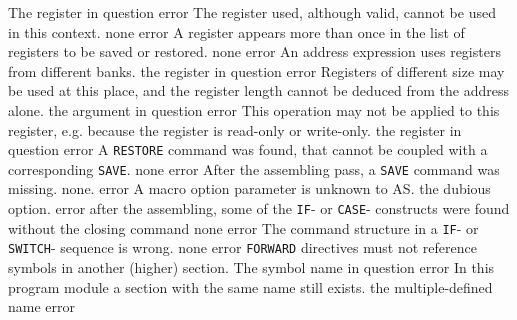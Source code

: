 \documentclass[12pt,twoside]{report}
\newcommand{\tty}[1]{{\tt #1}}
\newcommand{\asname}{{AS}}
\begin{document}
\begin{description}
               {The register in question}
               {error}
               {The register used, although valid, cannot be used in this
                context.}
               {none}
               {error}
               {A register appears more than once in the list of registers
                to be saved or restored.}
               {none}
               {error}
               {An address expression uses registers from different banks.}
               {the register in question}
               {error}
               {Registers of different size may be used at this place, and
                 the register length cannot be deduced from the address alone.}
               {the argument in question}
               {error}
               {This operation may not be applied to this register, e.g. because
                the register is read-only or write-only.}
               {the register in question}
               {error}
               {A \tty{RESTORE} command was found, that cannot be coupled with a
                corresponding \tty{SAVE}.}
               {none}
               {error}
               {After the assembling pass, a \tty{SAVE} command was missing.}
               {none.}
               {error}
               {A macro option parameter is unknown to \asname{}.}
               {the dubious option.}
               {error}
               {after the assembling, some of the \tty{IF}- or \tty{CASE}- constructs
                were found without the closing command}
               {none}
               {error}
               {The command structure in a \tty{IF}- or \tty{SWITCH}- sequence is
                wrong.}
               {none}
               {error}
               {\tty{FORWARD} directives must not reference symbols in
                another (higher) section.}
               {The symbol name in question}
               {error}
               {In this program module a section with the same name still
                exists.}
               {the multiple-defined name}
               {error}

\end{description}
\end{document}
